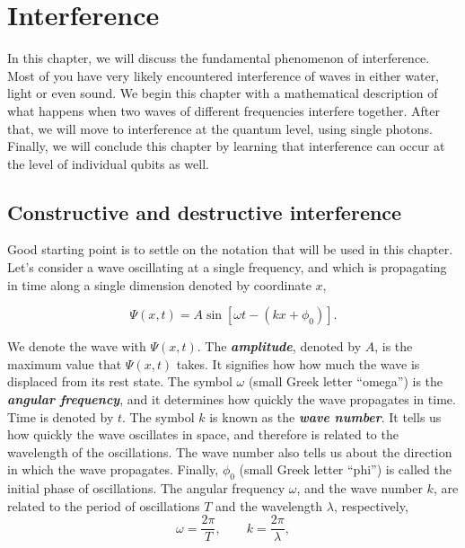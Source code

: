 \chapter{Interference}
\label{sec:6_interference}

In this chapter, we will discuss the fundamental phenomenon of interference.
Most of you have very likely encountered interference of waves in either water, light or even sound.
We begin this chapter with a mathematical description of what happens when two waves of different frequencies interfere together.
After that, we will move to interference at the quantum level, using single photons.
Finally, we will conclude this chapter by learning that interference can occur at the level of individual qubits as well.


\section{Constructive and destructive interference}
\label{sec:6-1_constructive_and_destructive_interference}


Good starting point is to settle on the notation that will be used in this chapter.
Let's consider a wave oscillating at a single frequency, and which is propagating in time along a single dimension denoted by coordinate $x$,

\begin{equation}
    \Psi(x,t) = A \sin [\omega t-(k x+\phi_0)].
    \label{eq:simple_wave}
\end{equation}

We denote the wave with $\Psi(x,t)$.
The \textbf{\emph{amplitude}}, denoted by $A$, is the maximum value that $\Psi(x,t)$ takes.
It signifies how how much the wave is displaced from its rest state.
The symbol $\omega$ (small Greek letter ``omega'') is the \textbf{\emph{angular frequency}}, and it determines how quickly the wave propagates in time.
Time is denoted by $t$.
The symbol $k$ is known as the \textbf{\emph{wave number}}.
It tells us how quickly the wave oscillates in space, and therefore is related to the wavelength of the oscillations.
The wave number also tells us about the direction in which the wave propagates.
Finally, $\phi_0$ (small Greek letter ``phi'') is called the initial phase of oscillations.
The angular frequency $\omega$, and the wave number $k$, are related to the period of oscillations $T$ and the wavelength $\lambda$, respectively,
\begin{equation}
    \omega=\frac{2 \pi}{T}, \qquad k=\frac{2 \pi}{\lambda},
    \label{eq:freq-period_k-wavelength}
\end{equation}

